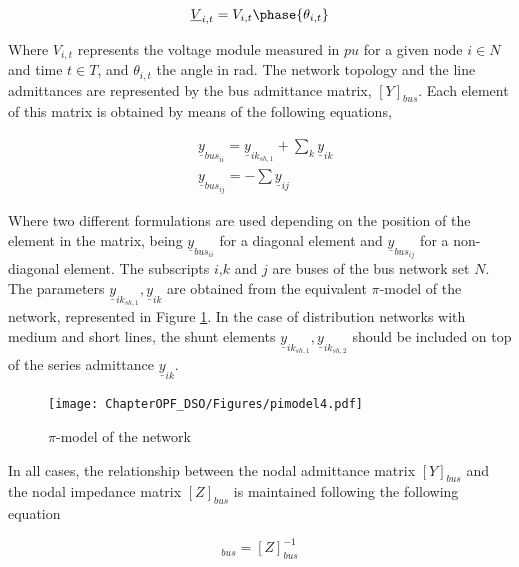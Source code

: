\begin{equation*}
\underline{V}_{i,t} = V_{i,t} \phase{\theta_{i,t}}
\end{equation*}

Where $V_{i,t}$ represents the voltage module measured in $pu$ for a given node $i \in N$ and time $t \in T$, and $\theta_{i,t}$ the angle in rad. The network topology and the line admittances are represented by the bus admittance matrix, $[Y]_{bus}$. Each element of this matrix is obtained by means of the following equations,

\begin{subequations}
\begin{align*}
& \underline{y}_{bus_{ii}}= \underline{y}_{ik_{sh,1}} + \sum_k \underline{y}_{ik} \\
& \underline{y}_{bus_{ij}} = - \sum \underline{y}_{ij}
\end{align*}
\end{subequations}

Where two different formulations are used depending on the position of the element in the matrix, being $\underline{y}_{bus_{ii}}$ for a diagonal element and $\underline{y}_{bus_{ij}}$ for a non-diagonal element. The subscripts $i$,$k$ and $j$ are buses of the bus network set $N$. The parameters  $\underline{y}_{ik_{sh,1}}, \underline{y}_{ik}$ are obtained from the equivalent $\pi$-model of the network, represented in Figure \ref{fig:pimodel}. In the case of distribution networks with medium and short lines, the shunt elements $\underline{y}_{ik_{sh,1}}, \underline{y}_{ik_{sh,2}}$ should be included on top of the series admittance $\underline{y}_{ik}$. 

\begin{figure}[htbp]
	\centering
	\texttt{[image: ChapterOPF\_DSO/Figures/pimodel4.pdf]}
		\caption{$\pi$-model of the network}
	\label{fig:pimodel}  
\end{figure}

In all cases, the relationship between the nodal admittance matrix  $[Y]_{bus}$ and the nodal impedance matrix  $[Z]_{bus}$ is maintained following the following equation 

\begin{equation*}
[Y]_{bus} = [Z]_{bus}^{-1}
\end{equation*}


